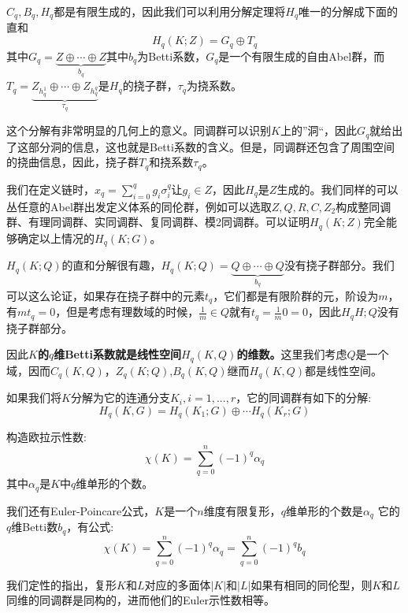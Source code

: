 \documentclass[supercite]{HustGraduPaper}
\begin{document}
\begin{appendices}
		$C_q,B_q, H_q$都是有限生成的，因此我们可以利用分解定理将$H_q$唯一的分解成下面的直和
		\begin{equation}
		H_q(K;Z) = G_q \oplus T_q
		\end{equation}
		其中$G_q  = \underbrace{Z \oplus \cdots \oplus Z}_{b_q}$其中$b_q$为Betti系数，$G_q$是一个有限生成的自由Abel群，而$T_q = \underbrace{Z_{h_q^1} \oplus \cdots \oplus Z_{h_q^q}}_{\tau_q}$是$H_q$的挠子群，$\tau_q$为挠系数。
		
		这个分解有非常明显的几何上的意义。同调群可以识别$K$上的”洞“，因此$G_q$就给出了这部分洞的信息，这也就是Betti系数的含义。但是，同调群还包含了周围空间的挠曲信息，因此，挠子群$T_q$和挠系数$\tau_q$。
		
		我们在定义链时，$x_q = \sum_{i = 0}^q g_i \sigma^q_i$让$g_i \in Z$，因此$H_q$是$Z$生成的。我们同样的可以丛任意的Abel群出发定义体系的同伦群，例如可以选取$Z,Q,R,C,Z_2$构成整同调群、有理同调群、实同调群、复同调群、模2同调群。可以证明$H_q(K;Z)$完全能够确定以上情况的$H_q(K;G)$。
		
		$H_q(K;Q)$的直和分解很有趣，$H_q(K;Q) = \underbrace{Q \oplus \cdots \oplus Q}_{b_q}$没有挠子群部分。我们可以这么论证，如果存在挠子群中的元素$t_q$，它们都是有限阶群的元，阶设为$m$，有$m t_q = 0$，但是考虑有理数域的时候，$\frac{1}{m} \in Q$就有$t_q = \frac{1}{m}0 = 0$，因此$H_q{H;Q}$没有挠子群部分。
		
		因此\textbf{$K$的$q$维Betti系数就是线性空间$H_q(K,Q)$的维数。}这里我们考虑$Q$是一个域，因而$C_q(K,Q)$，$Z_q(K;Q)$,$B_q(K,Q)$继而$H_q(K,Q)$都是线性空间。
		
		如果我们将$K$分解为它的连通分支$K_i, i =1,...,r$，它的同调群有如下的分解:
		\begin{equation}
		H_q(K,G) = H_q(K_1;G) \oplus \cdots H_q(K_r;G)
		\end{equation}
		
		
		构造欧拉示性数:
		\begin{equation}
		\chi(K) = \sum_{q= 0}^{n} (-1)^q \alpha_q
		\end{equation}
		其中$\alpha_q$是$K$中$q$维单形的个数。
		
		我们还有Euler-Poincare公式，$K$是一个$n$维度有限复形，$q$维单形的个数是$\alpha_q$ 它的$q$维Betti数$b_q$，有公式:
		\begin{equation}
		\chi(K) = \sum_{q = 0}^{n}(-1)^q \alpha_q = \sum_{q=0}^n(-1)^q b_q
		\end{equation}
		
		我们定性的指出，复形$K$和$L$对应的多面体$|K|$和$|L|$如果有相同的同伦型，则$K$和$L$同维的同调群是同构的，进而他们的Euler示性数相等。
		

\end{appendices}
\end{document}
